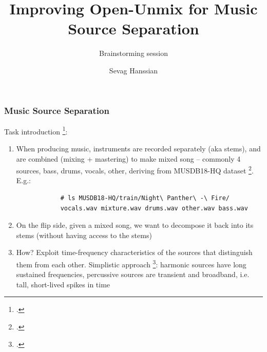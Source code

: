 \documentclass[usenames,dvipsnames]{beamer}
\title{Improving Open-Unmix for Music Source Separation}
\subtitle{Brainstorming session}
\author{Sevag Hanssian}
\institute{DDMAL, McGill}
\begin{document}
\begin{frame}
\maketitle
\end{frame}

\begin{frame}[fragile]
	\frametitle{Music Source Separation}
	Task introduction \footcite{musicsepgood}:
	\begin{enumerate}
		\item
			When producing music, instruments are recorded separately (aka stems), and are combined (mixing + mastering) to make mixed song -- commonly 4 sources, bass, drums, vocals, other, deriving from MUSDB18-HQ dataset \footcite{musdb18hq}. E.g.:
			\begin{verbatim}
			# ls MUSDB18-HQ/train/Night\ Panther\ -\ Fire/
			vocals.wav mixture.wav drums.wav other.wav bass.wav
			\end{verbatim}
		\item
			On the flip side, given a mixed song, we want to decompose it back into its stems (without having access to the stems)
		\item
			How? Exploit time-frequency characteristics of the sources that distinguish them from each other. Simplistic approach \footcite{fitzgerald1}: harmonic sources have long sustained frequencies, percussive sources are transient and broadband, i.e. tall, short-lived spikes in time
	\end{enumerate}
\end{frame}
\end{document}
